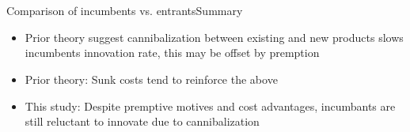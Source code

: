 \documentclass{beamer}
\begin{document}
\section{\cite{igami2015}}
\begin{frame}{Comparison of incumbents vs. entrants}{Summary}
\begin{itemize}
\item{Prior theory suggest cannibalization between existing and new products slows incumbents innovation rate, this may be offset by premption}
\item{Prior theory: Sunk costs tend to reinforce the above}
\item{This study: Despite premptive motives and cost advantages, incumbants are still reluctant to innovate due to cannibalization}
\end{itemize}
\end{frame}



\end{document}
